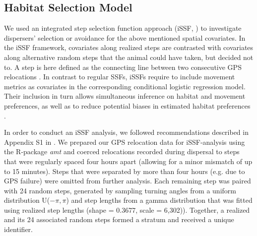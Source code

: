 \documentclass[abstract=on,10pt,a4paper,bibliography=totocnumbered]{scrartcl}
\begin{document}
\subsection{Habitat Selection Model}
\label{Modeling}
We used an integrated step selection function approach (iSSF, \cite{Avgar.2016})
to investigate dispersers' selection or avoidance for the above mentioned
spatial covariates. In the iSSF framework, covariates along realized steps are
contrasted with covariates along alternative random steps that the animal could
have taken, but decided not to. A step is here defined as the connecting line
between two consecutive GPS relocations \citep{Turchin.1998}. In contrast to
regular SSFs, iSSFs require to include movement metrics as covariates in the
corresponding conditional logistic regression model. Their inclusion in turn
allows simultaneous inference on habitat and movement preferences, as well as to
reduce potential biases in estimated habitat preferences \citep{Forester.2009,
Warton.2013, Avgar.2016}.

In order to conduct an iSSF analysis, we followed recommendations described in
Appendix S1 in \cite{Avgar.2016}. We prepared our GPS relocation data for
iSSF-analysis using the R-package \textit{amt} \citep{Amt.2019} and coerced
relocations recorded during dispersal to steps that were regularly spaced four
hours apart (allowing for a minor mismatch of up to 15 minutes). Steps that were
separated by more than four hours (e.g. due to GPS failure) were omitted from
further analysis. Each remaining step was paired with 24 random steps, generated
by sampling turning angles from a uniform distribution U(\(-\pi, \pi\)) and step
lengths from a gamma distribution that was fitted using realized step lengths
(shape = 0.3677, scale = 6,302)). Together, a realized and its 24 associated
random steps formed a stratum and received a unique identifier.
\end{document}
